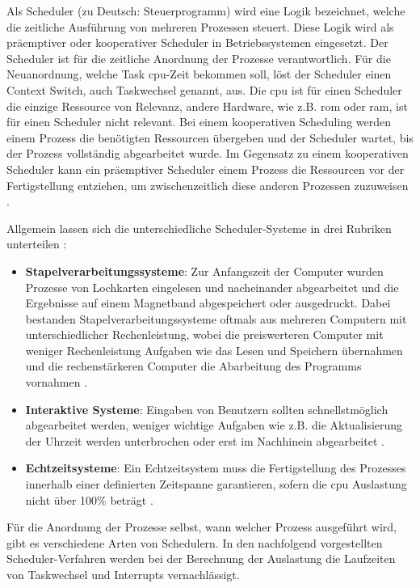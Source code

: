 \documentclass[../EDF Master Thesis.tex]{subfiles}
\begin{document}
Als Scheduler (zu Deutsch: Steuerprogramm) wird eine Logik bezeichnet, welche die zeitliche Ausführung von mehreren Prozessen steuert.
Diese Logik wird als präemptiver oder kooperativer Scheduler in Betriebssystemen eingesetzt.
Der Scheduler ist für die zeitliche Anordnung der Prozesse verantwortlich.
Für die Neuanordnung, welche Task \ac{cpu}-Zeit bekommen soll, löst der Scheduler einen Context Switch, auch Taskwechsel genannt, aus.
Die \ac{cpu} ist für einen Scheduler die einzige Ressource von Relevanz, andere Hardware, wie z.B. \ac{rom} oder \ac{ram}, ist für einen Scheduler nicht relevant.
Bei einem kooperativen Scheduling werden einem Prozess die benötigten Ressourcen übergeben und der Scheduler wartet, bis der Prozess vollständig abgearbeitet wurde.
Im Gegensatz zu einem kooperativen Scheduler kann ein präemptiver Scheduler einem Prozess die Ressourcen vor der Fertigstellung entziehen, um zwischenzeitlich diese anderen Prozessen zuzuweisen \parencite{mikrocontroller:001}.

Allgemein lassen sich die unterschiedliche Scheduler-Systeme in drei Rubriken unterteilen \parencite{wiki:007}:
\begin{itemize}
    \item \textbf{Stapelverarbeitungssysteme}: Zur Anfangszeit der Computer wurden Prozesse von Lochkarten eingelesen und nacheinander abgearbeitet und die Ergebnisse auf einem Magnetband abgespeichert oder ausgedruckt.
                                               Dabei bestanden Stapelverarbeitungssysteme oftmals aus mehreren Computern mit unterschiedlicher Rechenleistung, wobei die preiswerteren Computer mit weniger Rechenleistung Aufgaben wie das Lesen und Speichern übernahmen und die rechenstärkeren Computer die Abarbeitung des Programms vornahmen \autocite{grundkurs_betriebssysteme}.
    \item \textbf{Interaktive Systeme}: Eingaben von Benutzern sollten schnellstmöglich abgearbeitet werden, weniger wichtige Aufgaben wie z.B. die Aktualisierung der Uhrzeit werden unterbrochen oder erst im Nachhinein abgearbeitet \autocite{mikrocontroller:002}.
    \item \textbf{Echtzeitsysteme}: Ein Echtzeitsystem muss die Fertigstellung des Prozesses innerhalb einer definierten Zeitspanne garantieren, sofern die \ac{cpu} Auslastung nicht über 100\% beträgt \autocite{mikrocontroller:002}.
\end{itemize}

Für die Anordnung der Prozesse selbst, wann welcher Prozess ausgeführt wird, gibt es verschiedene Arten von Schedulern.
In den nachfolgend vorgestellten Scheduler-Verfahren werden bei der Berechnung der Auslastung die Laufzeiten von Taskwechsel und Interrupts vernachlässigt.
\end{document}
